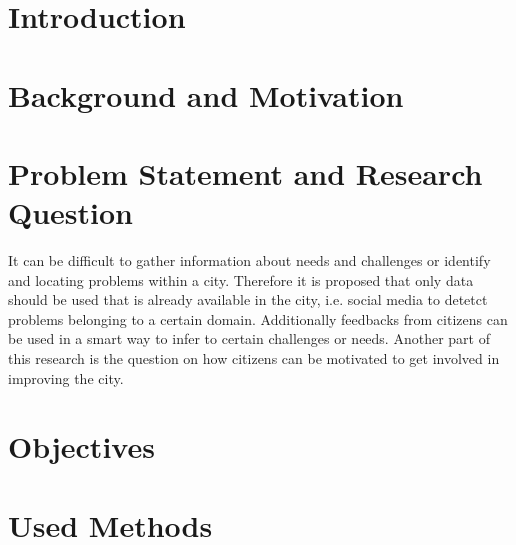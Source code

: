 \documentclass{article}
\begin{document}
	\hfill	
	\section{Introduction}
	\startsection
	\closesection
	
	\section{Background and Motivation}
	\startsection
	\closesection
	
	\section{Problem Statement and Research Question}
	\startsection
		It can be difficult to gather information about needs and challenges or identify and locating problems within a city. Therefore it is proposed that only data should be used that is already available in the city, i.e. social media to detetct problems belonging to a certain domain. Additionally feedbacks from citizens can be used in a smart way to infer to certain challenges or needs. Another part of this research is the question on how citizens can be motivated to get involved in improving the city.
	\closesection
	
	\section{Objectives}
	\startsection
	\closesection
	
	\section{Used Methods}
	\startsection
	\closesection
\end{document}
